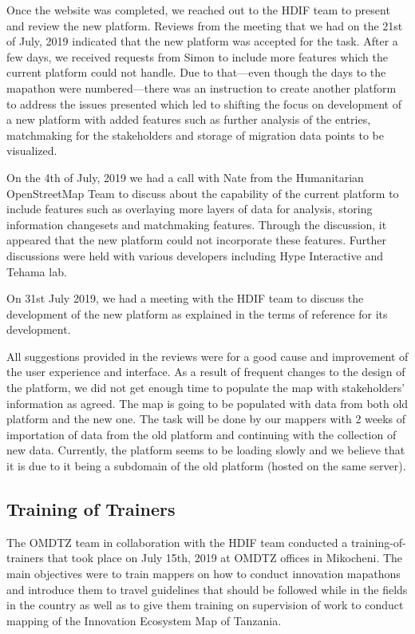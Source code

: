 \documentclass[a4paper,12pt,twoside]{article}
\begin{document}
Once the website was completed, we reached out to the HDIF team to present and review the new platform. Reviews from the meeting that we had on the 21st of July, 2019 indicated that the new platform was accepted for the task. After a few days, we received requests from Simon to include more features which the current platform could not handle. Due to that---even though the days to the mapathon were numbered---there was an instruction to create another platform to address the issues presented which led to shifting the focus on development of a new platform with added features such as further analysis of the entries, matchmaking for the stakeholders and storage of migration data points to be visualized.

On the 4th of July, 2019 we had a call with Nate from the Humanitarian OpenStreetMap Team to discuss about the capability of the current platform to include features such as overlaying more layers of data for analysis, storing information changesets and matchmaking features. Through the discussion, it appeared that the new platform could not incorporate these features. Further discussions were held with various developers including Hype Interactive and Tehama lab. 

On 31st July 2019, we had a meeting with the HDIF team to discuss the development of the new platform as explained in the terms of reference for its development.


All suggestions provided in the reviews were for a good cause and improvement of the user experience and interface. As a result of frequent changes to the design of the platform, we did not get enough time to populate the map with stakeholders’ information as agreed. The map is going to be populated with data from both old platform and the new one. The task will be done by our mappers with 2 weeks of importation of data from the old platform and continuing with the collection of new data. Currently, the platform seems to be loading slowly and we believe that it is due to it being a subdomain of the old platform (hosted on the same server).

\subsection{Training of Trainers}
The OMDTZ team in collaboration with the HDIF team conducted a training-of-trainers that took place on July 15th, 2019 at OMDTZ offices in Mikocheni. The main objectives were to train mappers on how to conduct innovation mapathons and introduce them to travel guidelines that should be followed while in the fields in the country as well as to give them training on supervision of work to conduct mapping of the Innovation Ecosystem Map of Tanzania.
\end{document}
